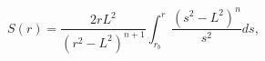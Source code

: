 \begin{equation}
S(r)=\frac{2rL^{2}}{(r^{2}-L^{2})^{n+1}} \int
^{r}_{r_{b}}\frac{(s^{2}-L^{2})^{n}}{s^{2}}ds \label{ratio},
\end{equation}\
